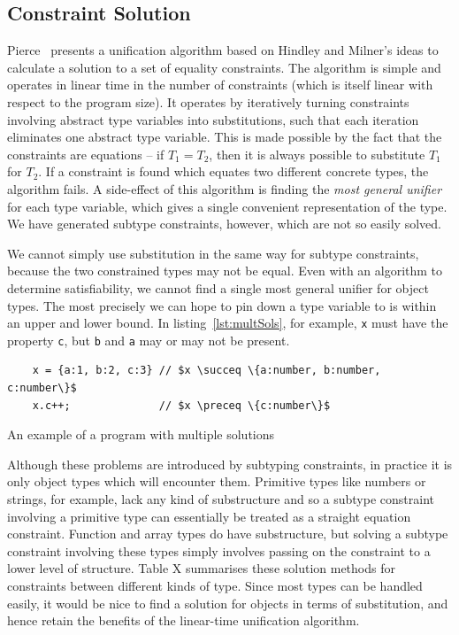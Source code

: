\documentclass[12pt,a4paper,twoside,openright]{report}
\theoremstyle{definition}
\theoremstyle{dotless}
\newcommand*{\js}{\texttt}
\begin{document}
\subsection{Constraint Solution}

Pierce~\cite{pierce} presents a unification algorithm based on Hindley and
Milner's ideas to calculate a solution to a set of equality constraints. The
algorithm is simple and operates in linear time in the number of constraints
(which is itself linear with respect to the program size). It operates by
iteratively turning constraints involving abstract type variables into
substitutions, such that each iteration eliminates one abstract type variable.
This is made possible by the fact that the constraints are equations -- if
$T_1=T_2$, then it is always possible to substitute $T_1$ for $T_2$. If a
constraint is found which equates two different concrete types, the algorithm
fails. A side-effect of this algorithm is finding the \textit{most general
  unifier} for each type variable, which gives a single convenient
representation of the type.  We have generated subtype constraints, however,
which are not so easily solved.

We cannot simply use substitution in the same way for subtype constraints,
because the two constrained types may not be equal. Even with an algorithm to
determine satisfiability, we cannot find a single most general unifier for
object types.  The most precisely we can hope to pin down a type variable to is
within an upper and lower bound.  In listing~\ref{lst:multSols}, for example,
\js{x} must have the property \js{c}, but \js{b} and \js{a} may or may not be
present.  

\begin{program}
  \begin{verbatim}
	x = {a:1, b:2, c:3} // $x \succeq \{a:number, b:number, c:number\}$
	x.c++;              // $x \preceq \{c:number\}$
  \end{verbatim}
  \caption{An example of a program with multiple solutions}\label{lst:multSols}
\end{program}

Although these problems are introduced by subtyping constraints, in practice it
is only object types which will encounter them. Primitive types like numbers or
strings, for example, lack any kind of substructure and so a subtype constraint
involving a primitive type can essentially be treated as a straight equation
constraint. Function and array types do have substructure, but solving a
subtype constraint involving these types simply involves passing on the
constraint to a lower level of structure. Table {\color{red}X} summarises these
solution methods for constraints between different kinds of type. Since most
types can be handled easily, it would be nice to find a solution for objects in
terms of substitution, and hence retain the benefits of the linear-time
unification algorithm. 
\end{document}
